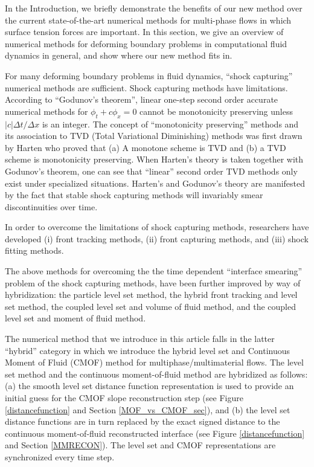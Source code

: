 \documentclass[]{article}
\begin{document}
In the Introduction, we briefly demonstrate the benefits of our
new method over the current state-of-the-art numerical methods
for multi-phase flows in which surface tension forces are important.  
In this section, we give an overview of numerical methods for 
deforming boundary problems in computational fluid dynamics in general,
and show where our new method fits in.

For many deforming boundary problems in fluid dynamics, ``shock capturing''
numerical methods are 
sufficient\cite{godunov1959finite,colella1984piecewise,van1979towards,harten1997high,shu1988efficient,saurel1999multiphase}. Shock capturing methods
have limitations.  According to 
``Godunov's theorem''\cite{godunov1954different}, linear one-step second
order accurate numerical methods for $\phi_{t}+c\phi_{x}=0$ cannot be
monotonicity preserving unless $|c|\Delta t/\Delta x$ is an 
integer.  The concept of ``monotonicity preserving'' methods and its
association to TVD (Total Variational Diminishing) methods was first 
drawn by Harten\cite{harten1997high} who proved that (a) A monotone
scheme is TVD and (b) a TVD scheme is monotonicity preserving.  
When Harten's theory is taken together with Godunov's theorem, one can
see that ``linear'' second order TVD methods only exist under
specialized situations.  Harten's and Godunov's theory are manifested by the
fact that stable shock capturing methods will invariably smear 
discontinuities over time.  

In order to overcome the limitations of shock capturing methods, researchers
have developed (i) front tracking 
methods\cite{glimm1981front,unverdi1992front},
(ii) front capturing 
methods\cite{markstein1951interaction,osher1988fronts,sussman1994level,hirt1981volume,brackbill1992continuum,ahn2007multi,ahn2009adaptive,olsson2005conservative,QiuETALPINNPHASEFIELD2022,
huang2020consistent}, and
(iii) shock fitting methods\cite{SalasShockfitting1976}.

The above methods for overcoming the
the time dependent 
``interface smearing'' problem of the shock capturing methods, have been
further improved by way of hybridization:
the particle level set method\cite{enright2002hybrid},
the hybrid front tracking and level set method\cite{shin2009hybrid},
the coupled level set and volume of fluid method\cite{sussman2000coupled},
and the coupled level set and moment of fluid 
method\cite{ASURIMUKUNDAN2022110864,jemison2013coupled}.

The numerical method that we introduce in this article falls in the latter
``hybrid'' category in which we introduce the hybrid level set and 
Continuous Moment of Fluid (CMOF) method for multiphase/multimaterial
flows.  The level set method and the continuous moment-of-fluid method
are hybridized as follows:
(a) the smooth level set distance function representation is used
to provide an initial guess for the CMOF slope reconstruction
step (see Figure \ref{distancefunction} and Section \ref{MOF_vs_CMOF_sec}),
and (b) the level set distance functions are in turn replaced by the
exact signed distance to the continuous moment-of-fluid reconstructed
interface (see Figure \ref{distancefunction} and 
Section \ref{MMRECON}).  The level set and CMOF representations are 
synchronized every time step.
\end{document}
